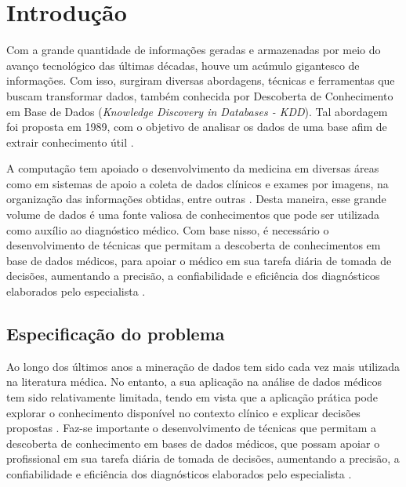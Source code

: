 \documentclass[
	12pt,				%
	openright,			%
	oneside,	
	a4paper,				%
	english,				%
	brazil				%
]{abntex2/abntex2} %
\begin{document}



\tableofcontents*
\cleardoublepage

\textual

\chapter{Introdução}

	Com a grande quantidade de informações geradas e armazenadas por meio do avanço tecnológico das últimas décadas, houve um acúmulo gigantesco de informações. Com isso, surgiram diversas abordagens, técnicas e ferramentas que buscam transformar dados, também conhecida por Descoberta de Conhecimento em Base de Dados (\textit{Knowledge Discovery in Databases - KDD}). Tal abordagem foi proposta em 1989, com o objetivo de analisar os dados de uma base afim de extrair conhecimento útil \cite{fayyad:1996}.	
	
	A computação tem apoiado o desenvolvimento da medicina em diversas áreas como em sistemas de apoio a coleta de dados clínicos e exames por imagens, na organização das informações obtidas, entre outras \cite{costa:2012}. Desta maneira, esse grande volume de dados é uma fonte valiosa de conhecimentos que pode ser utilizada como auxílio ao diagnóstico médico. Com base nisso, é necessário o desenvolvimento de técnicas que permitam a descoberta de conhecimentos em base de dados médicos, para apoiar o médico em sua tarefa diária de tomada de decisões, aumentando a precisão, a confiabilidade e eficiência dos diagnósticos elaborados pelo especialista \cite{costa:2012}.
    
    \newpage
	\section{Especificação do problema}
		
		Ao longo dos últimos anos a mineração de dados tem sido cada vez mais utilizada na literatura médica. No entanto, a sua aplicação na análise de dados médicos tem sido relativamente limitada, tendo em vista que a aplicação prática pode explorar o conhecimento disponível no contexto clínico e explicar decisões propostas \cite{bellazzi:2008}. Faz-se importante o desenvolvimento de técnicas que permitam a descoberta de conhecimento em bases de dados médicos, que possam apoiar o profissional em sua tarefa diária de tomada de decisões, aumentando a precisão, a confiabilidade e eficiência dos diagnósticos elaborados pelo especialista \cite{costa:2012}.
		
\end{document}
